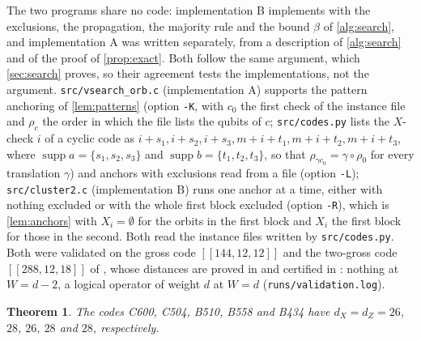 \documentclass[11pt]{amsart}
\newtheorem{theorem}{Theorem}[section]
\theoremstyle{definition}
\theoremstyle{remark}
\newcommand{\supp}{\operatorname{supp}}
\begin{document}
The two programs share no code: implementation B implements \cite[Alg.~1]{RD26} with the exclusions, the propagation, the majority rule and the bound $\beta$ of \cref{alg:search}, and implementation A was written separately, from a description of \cref{alg:search} and of the proof of \cref{prop:exact}. Both follow the same argument, which \cref{sec:search} proves, so their agreement tests the implementations, not the argument. \texttt{src/vsearch\_orb.c} (implementation A) supports the pattern anchoring of \cref{lem:patterns} (option \texttt{-K}, with $c_0$ the first check of the instance file and $\rho_c$ the order in which the file lists the qubits of $c$; \texttt{src/codes.py} lists the $X$-check $i$ of a cyclic code as $i+s_1,i+s_2,i+s_3,m+i+t_1,m+i+t_2,m+i+t_3$, where $\supp a=\{s_1,s_2,s_3\}$ and $\supp b=\{t_1,t_2,t_3\}$, so that $\rho_{\gamma c_0}=\gamma\circ\rho_0$ for every translation $\gamma$) and anchors with exclusions read from a file (option \texttt{-L}); \texttt{src/cluster2.c} (implementation B) runs one anchor at a time, either with nothing excluded or with the whole first block excluded (option \texttt{-R}), which is \cref{lem:anchors} with $X_i=\emptyset$ for the orbits in the first block and $X_i$ the first block for those in the second. Both read the instance files written by \texttt{src/codes.py}. Both were validated on the gross code $[[144,12,12]]$ and the two-gross code $[[288,12,18]]$ of \cite{B+24}, whose distances are proved in \cite{RD26} and certified in \cite{CGP26}: nothing at $W=d-2$, a logical operator of weight $d$ at $W=d$ (\texttt{runs/validation.log}).

\begin{theorem}\label{thm:main}
The codes C600, C504, B510, B558 and B434 have $d_X=d_Z=26$, $28$, $26$, $28$ and $28$, respectively.
\end{theorem}
\end{document}

